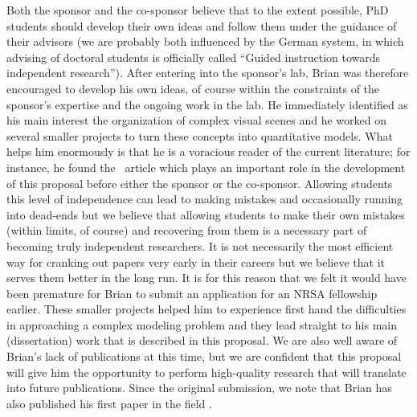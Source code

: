 \documentclass[11pt,notitlepage]{article}
\begin{document}
Both the sponsor and the co-sponsor believe that to the extent
possible, PhD students should develop their own ideas and follow them
under the guidance of their advisors (we are probably both influenced
by the German system, in which advising of doctoral students is
officially called ``Guided instruction towards independent
research''). After entering into the sponsor's lab, Brian was
therefore encouraged to develop his own ideas, of course within the
constraints of the sponsor's expertise and the ongoing work in the
lab. He immediately identified as his main interest the organization
of complex visual scenes and he worked on several smaller projects to
turn these concepts into quantitative models.  What helps him
enormously is that he is a voracious reader of the current literature;
for instance, he found the~\citet{Chen_etal14} article which plays an
important role in the development of this proposal before either the
sponsor or the co-sponsor. Allowing students this level of
independence can lead to making mistakes and occasionally running into
dead-ends but we believe that allowing students to make their own
mistakes (within limits, of course) and recovering from them is a
necessary part of becoming truly independent researchers. It is not
necessarily the most efficient way for cranking out papers very early
in their careers
 but we believe that it serves them better in the long
run. It is for this reason that we felt it would have been premature
for Brian to submit an application for an NRSA fellowship
earlier. These smaller projects helped him to experience first hand
the difficulties in approaching a complex modeling problem and they lead
straight to his main (dissertation) work that is described in this
proposal.
We are also well aware of Brian's lack of publications at
this time, but
we are confident that this proposal will give him the opportunity to
perform high-quality research that will translate into future
publications. 
Since the original submission, we note that Brian has also published his first
paper in the field \citep{Hu_etal15a}.
\end{document}
